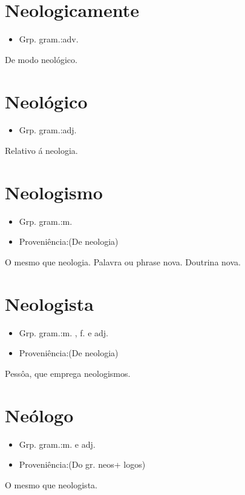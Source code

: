 \section{Neologicamente}
\begin{itemize}
\item {Grp. gram.:adv.}
\end{itemize}
De modo neológico.
\section{Neológico}
\begin{itemize}
\item {Grp. gram.:adj.}
\end{itemize}
Relativo á neologia.
\section{Neologismo}
\begin{itemize}
\item {Grp. gram.:m.}
\end{itemize}
\begin{itemize}
\item {Proveniência:(De \textunderscore neologia\textunderscore )}
\end{itemize}
O mesmo que \textunderscore neologia\textunderscore .
Palavra ou phrase nova.
Doutrina nova.
\section{Neologista}
\begin{itemize}
\item {Grp. gram.:m. ,  f.  e  adj.}
\end{itemize}
\begin{itemize}
\item {Proveniência:(De \textunderscore neologia\textunderscore )}
\end{itemize}
Pessôa, que emprega neologismos.
\section{Neólogo}
\begin{itemize}
\item {Grp. gram.:m.  e  adj.}
\end{itemize}
\begin{itemize}
\item {Proveniência:(Do gr. \textunderscore neos\textunderscore  + \textunderscore logos\textunderscore )}
\end{itemize}
O mesmo que \textunderscore neologista\textunderscore .
